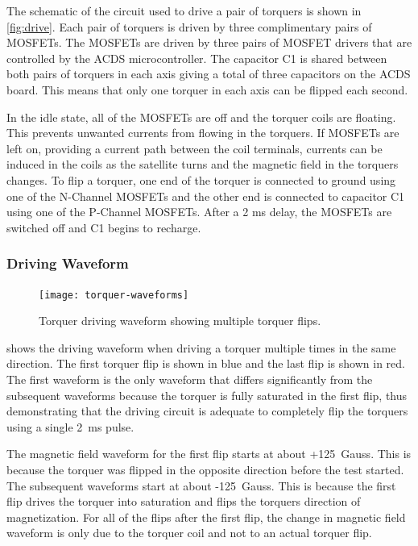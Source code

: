 The schematic of the circuit used to drive a pair of torquers is shown in \cref{fig:drive}. Each pair of torquers is driven by three complimentary pairs of \acp{MOSFET}.  The \acp{MOSFET} are driven by three pairs of \ac{MOSFET} drivers that are controlled by the \ac{ACDS} microcontroller. The capacitor C1 is shared between both pairs of torquers in each axis giving a total of three capacitors on the \ac{ACDS} board. This means that only one torquer in each axis can be flipped each second. 

In the idle state, all of the \acp{MOSFET} are off and the torquer coils are floating. This prevents unwanted currents from flowing in the torquers. If \acp{MOSFET} are left on, providing a current path between the coil terminals, currents can be induced in the coils as the satellite turns and the magnetic field in the torquers changes. To flip a torquer, one end of the torquer is connected to ground using one of the N-Channel \acp{MOSFET} and the other end is connected to capacitor C1 using one of the P-Channel \acp{MOSFET}. After a 2 ms delay, the \acp{MOSFET} are switched off and C1 begins to recharge.

\subsubsection{Driving Waveform}

\begin{figure}[htb!]
    \centering
    \texttt{[image: torquer-waveforms]}
    \caption{Torquer driving waveform showing multiple torquer flips.}
    \label{fig:driveWV}
\end{figure}

 shows the driving waveform when driving a torquer multiple times in the same direction. The first torquer flip is shown in blue and the last flip is shown in red. The first waveform is the only waveform that differs significantly from the subsequent waveforms because the torquer is fully saturated in the first flip, thus demonstrating that the driving circuit is adequate to completely flip the torquers using a single 2~ms pulse.

The magnetic field waveform for the first flip starts at about +125~Gauss. This is because the torquer was flipped in the opposite direction before the test started. The subsequent waveforms start at about -125~Gauss. This is because the first flip drives the torquer into saturation and flips the torquers direction of magnetization. For all of the flips after the first flip, the change in magnetic field waveform is only due to the torquer coil and not to an actual torquer flip.

